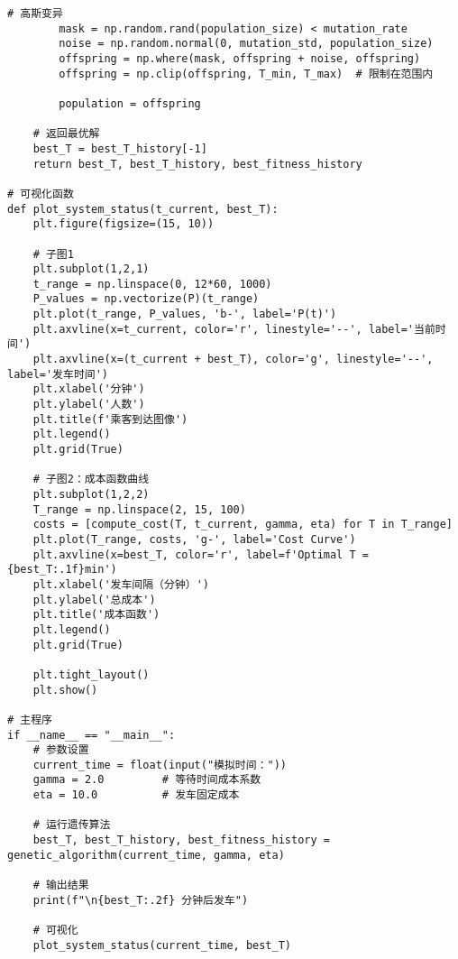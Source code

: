 \begin{lstlisting}[caption={遗传算法}]
        # 高斯变异
        mask = np.random.rand(population_size) < mutation_rate
        noise = np.random.normal(0, mutation_std, population_size)
        offspring = np.where(mask, offspring + noise, offspring)
        offspring = np.clip(offspring, T_min, T_max)  # 限制在范围内
        
        population = offspring

    # 返回最优解
    best_T = best_T_history[-1]
    return best_T, best_T_history, best_fitness_history

# 可视化函数
def plot_system_status(t_current, best_T):
    plt.figure(figsize=(15, 10))
    
    # 子图1
    plt.subplot(1,2,1)
    t_range = np.linspace(0, 12*60, 1000)
    P_values = np.vectorize(P)(t_range)
    plt.plot(t_range, P_values, 'b-', label='P(t)')
    plt.axvline(x=t_current, color='r', linestyle='--', label='当前时间')
    plt.axvline(x=(t_current + best_T), color='g', linestyle='--', label='发车时间')
    plt.xlabel('分钟')
    plt.ylabel('人数')
    plt.title(f'乘客到达图像')
    plt.legend()
    plt.grid(True)

    # 子图2：成本函数曲线
    plt.subplot(1,2,2)
    T_range = np.linspace(2, 15, 100)
    costs = [compute_cost(T, t_current, gamma, eta) for T in T_range]
    plt.plot(T_range, costs, 'g-', label='Cost Curve')
    plt.axvline(x=best_T, color='r', label=f'Optimal T = {best_T:.1f}min')
    plt.xlabel('发车间隔（分钟）')
    plt.ylabel('总成本')
    plt.title('成本函数')
    plt.legend()
    plt.grid(True)

    plt.tight_layout()
    plt.show()

# 主程序
if __name__ == "__main__":
    # 参数设置
    current_time = float(input("模拟时间："))
    gamma = 2.0         # 等待时间成本系数
    eta = 10.0          # 发车固定成本

    # 运行遗传算法
    best_T, best_T_history, best_fitness_history = genetic_algorithm(current_time, gamma, eta)

    # 输出结果
    print(f"\n{best_T:.2f} 分钟后发车")

    # 可视化
    plot_system_status(current_time, best_T)
\end{lstlisting}